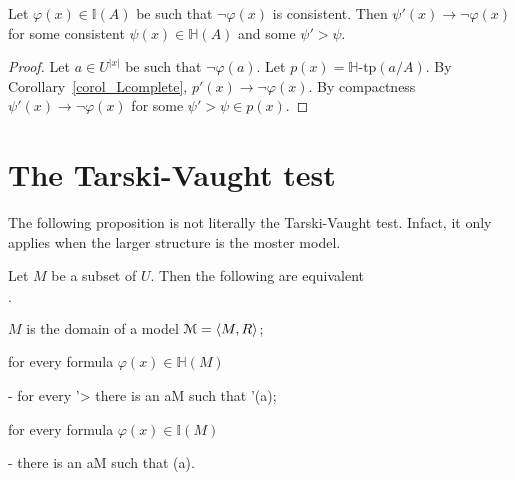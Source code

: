 \documentclass[11pt,oneside]{amsart}
\newcommand{\mylabel}[1]{{#1}\hfill}
\renewenvironment{itemize}
  {\begin{list}{$\cdot$}{%
  \setlength{\parskip}{0mm}
  \setlength{\topsep}{.2\baselineskip}
  \setlength{\rightmargin}{0mm}
  \setlength{\listparindent}{0mm}
  \setlength{\itemindent}{0mm}
  \setlength{\labelwidth}{3ex}
  \setlength{\itemsep}{.2\baselineskip}
  \setlength{\parsep}{.2\baselineskip}
  \setlength{\partopsep}{0mm}
  \setlength{\labelsep}{1ex}
  \setlength{\leftmargin}{\labelwidth+\labelsep}
  \let\makelabel\mylabel}}{%
\end{list}}
\begin{document}
\begin{proposition}\label{prop_LHapprox2}
  Let $\varphi(x)\in\mathds{I}(A)$ be such that $\neg\varphi(x)$ is consistent.
  Then  $\psi'(x)\rightarrow\neg\varphi(x)$ for some consistent $\psi(x)\in\mathds{H}(A)$ and some $\psi'>\psi$.
\end{proposition}



\begin{proof}
  Let $a\in U^{|x|}$ be such that $\neg\varphi(a)$.
  Let $p(x)=\mathds{H}\mbox{-tp}(a/A)$.
  By Corollary~\ref{corol_Lcomplete}, $p'(x)\rightarrow\neg\varphi(x)$. 
  By compactness  $\psi'(x)\rightarrow\neg\varphi(x)$ for some $\psi'>\psi\in p(x)$. 
\end{proof}


\section{The Tarski-Vaught test}

The following proposition is not literally the Tarski-Vaught test.
Infact, it only applies when the larger structure is the moster model.

\begin{proposition}
  Let $M$ be a subset of $U$.
  Then the following are equivalent
  \begin{itemize}
    \item[1.] $M$ is the domain of a model ${\EuScript M}=\langle M,R\rangle$;
    \item[2.] for every formula $\varphi(x)\in\mathds{H}(M)$
    
    \noindent\kern-\leftmargin
    {\textrm{ for every }\varphi'>\varphi\textrm{ there is an }a\in M\textrm{ such that }\varphi'(a);}
    \item[3.] for every formula $\varphi(x)\in\mathds{I}(M)$
    
    \noindent\kern-\leftmargin
    {\textrm{ there is an }a\in M\textrm{ such that }\neg\varphi(a).}
    
  \end{itemize}
\end{proposition}
\end{document}
